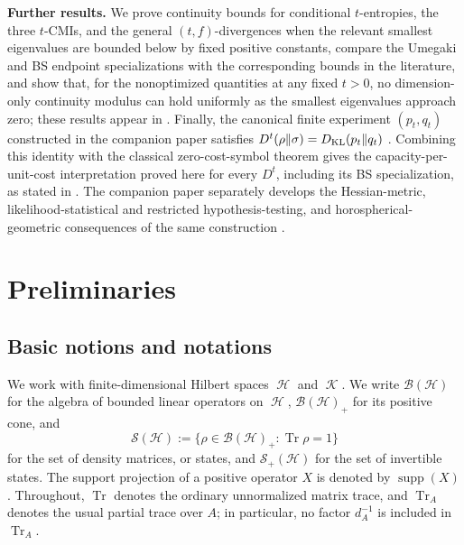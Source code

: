 \documentclass[11pt]{article}
\theoremstyle{remark}
\newcommand{\1}{\mathbbm{1}}
\DeclareMathOperator{\cH}{\mathcal{H}}
\DeclareMathOperator{\cK}{\mathcal{K}}
\begin{document}
\medskip
\noindent\textbf{Further results.}
We prove continuity bounds for conditional $t$-entropies, the three
$t$-CMIs, and the general $(t,f)$-divergences when the relevant
smallest eigenvalues are bounded below by fixed positive constants,
compare the Umegaki and BS endpoint specializations with the
corresponding bounds in the literature,
and show that, for the nonoptimized quantities at any fixed $t>0$,
no dimension-only continuity modulus can hold uniformly as the
smallest eigenvalues approach zero; these results appear in
.  Finally, the canonical
finite experiment $(p_t,q_t)$ constructed in the companion paper
satisfies
$D^t(\rho\Vert\sigma)=D_{\rm KL}(p_t\Vert q_t)$
\cite[Theorem~3.1 and Proposition~3.3(i)]{capel2026informationgeometry}.
Combining this identity with the classical zero-cost-symbol theorem
gives the capacity-per-unit-cost interpretation proved here for every
$D^t$, including its BS specialization, as stated in .
The companion paper separately develops the Hessian-metric,
likelihood-statistical and restricted hypothesis-testing, and
horospherical-geometric consequences of the same construction
\cite[Theorems~2.3 and~2.5--2.6, Propositions~3.2--3.3,
and Section~4]{capel2026informationgeometry}.

\FloatBarrier

\section{Preliminaries}
\label{rw:sec:preliminaries}

\subsection{Basic notions and notations}
\label{rw:subsec:states-channels}

We work with finite-dimensional Hilbert spaces $\cH$ and $\cK$.  We write
$\mathcal B(\mathcal H)$ for the algebra of bounded linear operators on
$\cH$, $\mathcal B(\mathcal H)_+$ for its positive cone, and
\begin{equation}
   \mathcal S(\mathcal H)
 :=\{\rho\in\mathcal B(\mathcal H)_+:
          \operatorname{Tr}\rho=1\}  
\end{equation}
for the set of density matrices, or states, and
$\mathcal S_{+}(\mathcal H)$
for the set of invertible states. The support projection of a
positive operator $X$ is denoted by $\operatorname{supp}(X)$.
Throughout, $\operatorname{Tr}$ denotes the ordinary unnormalized
matrix trace, and $\operatorname{Tr}_A$ denotes the usual partial
trace over $A$; in particular, no factor $d_A^{-1}$ is included in
$\operatorname{Tr}_A$.
\end{document}
